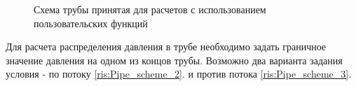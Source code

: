 \begin{figure}[h!]
\begin{center}

	\caption{Схема трубы принятая для расчетов с использованием пользовательских функций}
	\label{ris:Pipe_scheme_1}

\end{center}
\end{figure}


Для расчета распределения давления в трубе необходимо задать граничное значение давления на одном из концов трубы. Возможно два варианта задания условия - по потоку  \ref{ris:Pipe_scheme_2}. и против потока  \ref{ris:Pipe_scheme_3}. 


